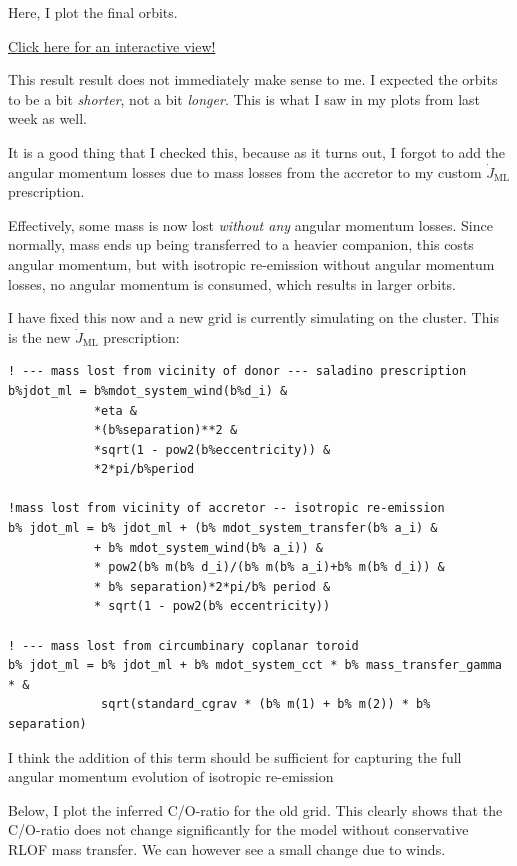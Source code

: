 \documentclass[a4paper,10pt]{article}
\begin{document}
Here, I plot the final orbits.
\begin{figure}[ht]
    \centering
\end{figure}

\href{https://s-koen.github.io/figures/#/plots/master-internship/w20/periods}{Click here for an interactive view!}

This result result does not immediately make sense to me. I expected the orbits to be a bit \emph{shorter}, not a bit \emph{longer}. This is what I saw in my plots from last week as well.

It is a good thing that I checked this, because as it turns out, I forgot to add the angular momentum losses due to mass losses from the accretor to my custom \(\dot{J}_\text{ML}\) prescription.

Effectively, some mass is now lost \emph{without any} angular momentum losses. Since normally, mass ends up being transferred to a heavier companion, this costs angular momentum, but with isotropic re-emission without angular momentum losses, no angular momentum is consumed, which results in larger orbits.

I have fixed this now and a new grid is currently simulating on the cluster.
This is the new \(\dot{J}_\text{ML} \) prescription:
\begin{verbatim}
! --- mass lost from vicinity of donor --- saladino prescription
b%jdot_ml = b%mdot_system_wind(b%d_i) &
            *eta &
            *(b%separation)**2 &
            *sqrt(1 - pow2(b%eccentricity)) &
            *2*pi/b%period

!mass lost from vicinity of accretor -- isotropic re-emission
b% jdot_ml = b% jdot_ml + (b% mdot_system_transfer(b% a_i) & 
            + b% mdot_system_wind(b% a_i)) &
            * pow2(b% m(b% d_i)/(b% m(b% a_i)+b% m(b% d_i)) &
            * b% separation)*2*pi/b% period &
            * sqrt(1 - pow2(b% eccentricity))

! --- mass lost from circumbinary coplanar toroid
b% jdot_ml = b% jdot_ml + b% mdot_system_cct * b% mass_transfer_gamma * &
             sqrt(standard_cgrav * (b% m(1) + b% m(2)) * b% separation)
\end{verbatim}

I think the addition of this term should be sufficient for capturing the full angular momentum evolution of isotropic re-emission


Below, I plot the inferred C/O-ratio for the old grid. This clearly shows that the C/O-ratio does not change significantly for the model without conservative RLOF mass transfer. We can however see a small change due to winds.
\end{document}
